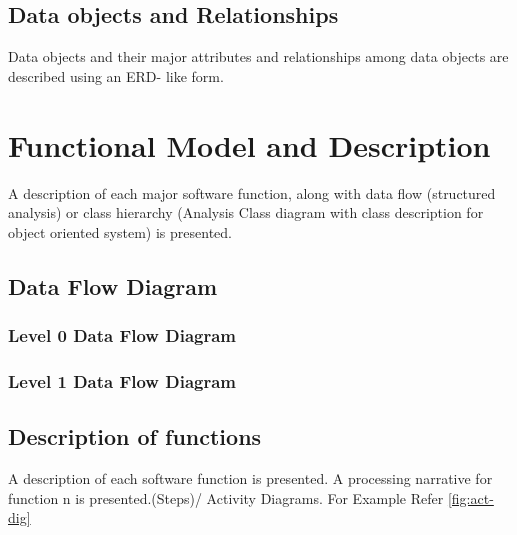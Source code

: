 \documentclass[oneside,a4paper,12pt]{report}
\begin{document}
\subsection{Data objects and Relationships}
  Data objects and their major attributes and relationships among data objects are described using an ERD- like form.

 
 
\section{Functional Model and Description}  
A description of each major software function, along with data flow (structured analysis) or class hierarchy (Analysis Class diagram with class description for object oriented system) is presented. 
\subsection{Data Flow Diagram}  
\subsubsection{Level 0 Data Flow Diagram}
\subsubsection{Level 1 Data Flow Diagram}
 
\subsection{Description of functions}  
A description of each software function is presented. A processing narrative for function n is presented.(Steps)/ Activity Diagrams. For Example Refer \ref{fig:act-dig}
\end{document}
